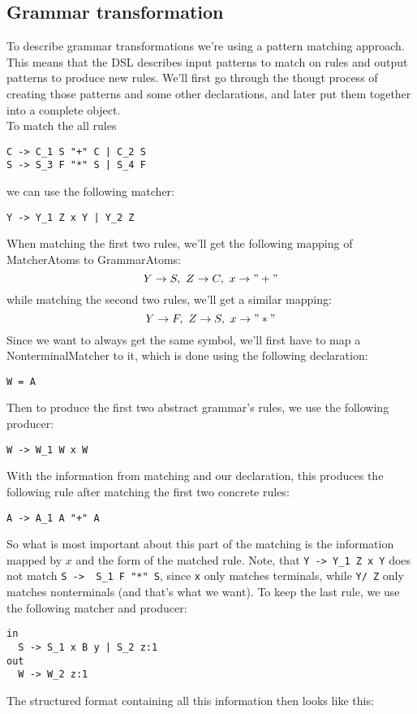 \documentclass[a4paper]{article}
\begin{document}
\subsection{Grammar transformation}
To describe grammar transformations we're using a pattern matching approach. This means that the DSL describes input patterns to match on rules and output patterns to produce new rules. We'll first go through the thougt process of creating those patterns and some other declarations, and later put them together into a complete object.\\
To match the all rules 
\begin{lstlisting}[language=grammar]
C -> C_1 S "+" C | C_2 S
S -> S_3 F "*" S | S_4 F
\end{lstlisting}
we can use the following matcher:
\lstset{language=transformer}
\begin{lstlisting}
Y -> Y_1 Z x Y | Y_2 Z
\end{lstlisting}
When matching the first two rules, we'll get the following mapping of MatcherAtoms to GrammarAtoms:
$$Y\to S, ~Z\to C, ~x\to "+"$$
while matching the second two rules, we'll get a similar mapping: 
$$Y\to F, ~Z\to S, ~x\to "*"$$
Since we want to always get the same symbol, we'll first have to map a NonterminalMatcher to it, which is done using the following declaration:
\begin{lstlisting}
W = A
\end{lstlisting}
Then to produce the first two abstract grammar's rules, we use the following producer:
\begin{lstlisting}
W -> W_1 W x W
\end{lstlisting}
With the information from matching and our declaration, this produces the following rule after matching the first two concrete rules:
\begin{lstlisting}[language=grammar]
A -> A_1 A "+" A
\end{lstlisting}
So what is most important about this part of the matching is the information mapped by $x$ and the form of the matched rule. Note, that \lstinline{Y -> Y_1 Z x Y} does not match \lstinline[language=grammar]{S ->  S_1 F "*" S}, since \lstinline{x} only matches terminals, while \lstinline{Y/ Z} only matches nonterminals (and that's what we want). To keep the last rule, we use the following matcher and producer:
\begin{lstlisting}
in
  S -> S_1 x B y | S_2 z:1
out
  W -> W_2 z:1
\end{lstlisting}
The structured format containing all this information then looks like this:
\end{document}
